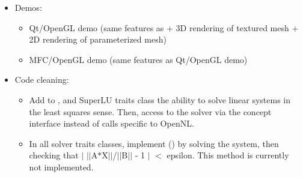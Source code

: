 \begin{itemize}
\item Demos:

    \begin{itemize}

        \item Qt/OpenGL demo (same features as 
        + 3D rendering of textured mesh + 2D rendering of parameterized mesh)

        \item MFC/OpenGL demo (same features as Qt/OpenGL demo)

    \end{itemize}

\item Code cleaning:

    \begin{itemize}

    \item Add to , 
    and SuperLU traits class
    the ability to solve linear systems in the least squares sense. Then, access to
    the solver via the concept interface instead of calls specific to OpenNL.

    \item In all solver traits classes,
    implement () by solving the system, then checking that $|$ $|$$|$A$\ast$X$|$$|$/$|$$|$B$|$$|$ - 1 $|$ $<$ epsilon. This method is
    currently not implemented.

    \end{itemize}

\end{itemize}

